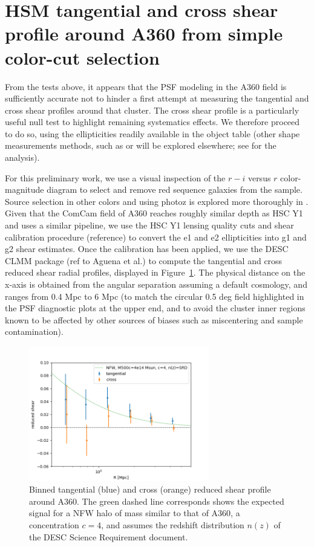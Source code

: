 \documentclass[SE,lsstdraft,authoryear,toc]{lsstdoc}
\begin{document}
\section{HSM tangential and cross shear profile around A360 from simple color-cut selection}
\label{sec:shear_profile}

From the tests above, it appears that the PSF modeling in the A360 field is sufficiently accurate not to hinder a first attempt at measuring the tangential and cross shear profiles around that cluster. The cross shear profile is a particularly useful null test to highlight remaining systematics effects. We therefore proceed to do so, using the  ellipticities readily available in the object table (other shape measurements methods, such as  or  will be explored elsewhere; see \citet{SITCOMTN-162} for the  analysis). 

For this preliminary work, we use a visual inspection of the $r-i$ versus $r$ color-magnitude diagram to select and remove red sequence galaxies from the sample. Source selection in other colors and using photoz is explored more thoroughly in \citet{SITCOMTN-163}. 
Given that the ComCam field of A360 reaches roughly similar depth as HSC Y1 and uses a similar pipeline, we use the HSC Y1 lensing quality cuts and shear calibration procedure (reference) to convert the e1 and e2 ellipticities into g1 and g2 shear estimates. Once the calibration has been applied, we use the DESC CLMM package (ref to Aguena et al.) to compute the tangential and cross reduced shear radial profiles, displayed in Figure~\ref{fig:shear_profile}. The physical distance on the x-axis is obtained from the angular separation assuming a default cosmology, and ranges from 0.4 Mpc to 6 Mpc (to match the circular 0.5 deg field highlighted in the PSF diagnostic plots at the upper end, and to avoid the cluster inner regions known to be affected by other sources of biases such as miscentering and sample contamination). 

\begin{figure}
\centering
\includegraphics[width=0.7\textwidth]{Figures/shear_profile.png}
\caption{Binned tangential (blue) and cross (orange) reduced shear profile around A360. The green dashed line corresponds shows the expected signal for a NFW halo of mass similar to that of A360, a concentration $c=4$, and assumes the redshift distribution $n(z)$ of the DESC Science Requirement document. \label{fig:shear_profile}}
\end{figure}
\end{document}
